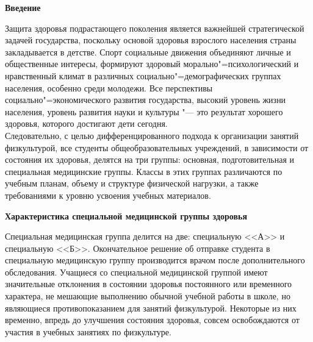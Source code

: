 \begin{flushleft}
    \setlength{\parindent}{14pt}
    \hspace*{10pt}
    \begin{center}
        \textbf{Введение}
    \end{center}
    \vspace*{14pt}

    Защита здоровья подрастающего поколения является важнейшей стратегической задачей государства, поскольку
    основой здоровья взрослого населения страны закладывается в детстве.
    Спорт социальные движения объединяют личные и общественные интересы,
    формируют здоровый морально"=психологический и нравственный климат в различных
    социально"=демографических группах населения, особенно среди молодежи. Все перспективы
    социально"=экономического развития государства, высокий уровень жизни населения, уровень развития
    науки и культуры "--- это результат хорошего здоровья, которого достигают дети сегодня. \\

    Следовательно, с целью дифференцированного подхода к организации занятий физкультурой,
    все студенты общеобразовательных учреждений, в зависимости от состояния их здоровья,
    делятся на три группы: основная, подготовительная и специальная медицинские группы.
    Классы в этих группах различаются по учебным планам, объему и структуре
    физической нагрузки, а также требованиями к уровню усвоения учебных материалов.

    \newpage
    \begin{center}
        \textbf{Характеристика специальной медицинской группы здоровья}
    \end{center}
    \vspace*{14pt}

Специальная медицинская группа делится на две: специальную <<А>> и специальную <<Б>>.
Окончательное решение об отправке студента в специальную медицинскую группу
производится врачом после дополнительного обследования. Учащиеся со специальной медицинской группой 
имеют  значительные отклонения в состоянии  здоровья постоянного или временного характера,
не мешающие выполнению обычной  учебной работы в школе, но являющиеся противопоказанием для 
занятий  физкультурой. Некоторые из них временно, впредь до улучшения
состояния здоровья, совсем освобождаются от участия  в учебных занятиях по физкультуре.\\


\end{flushleft}
